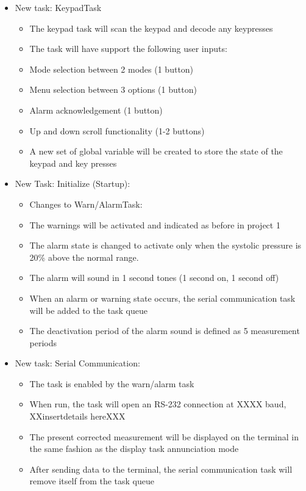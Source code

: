 \documentclass[12pt]{article} %
\begin{document}
\begin{itemize}
  \item New task: KeypadTask
    \begin{itemize}
      \item The keypad task will scan the keypad and decode any keypresses
      \item The task will have support the following user inputs:
      \item Mode selection between 2 modes (1 button)
      \item Menu selection between 3 options (1 button)
      \item Alarm acknowledgement (1 button)
      \item Up and down scroll functionality (1-2 buttons)
      \item A new set of global variable will be created to store the state of the keypad and key presses
    \end{itemize}

  \item New Task: Initialize (Startup):
    \begin{itemize}
      \item Changes to Warn/AlarmTask:
      \item The warnings will be activated and indicated as before in project 1
      \item The alarm state is changed to activate only when the systolic
	pressure is 20\% above the normal range.
      \item The alarm will sound in 1 second tones (1 second on, 1 second off)
      \item When an alarm or warning state occurs, the serial communication
	task will be added to the task queue
      \item The deactivation period of the alarm sound is defined as 5
	measurement periods
    \end{itemize}

  \item New task: Serial Communication:
    \begin{itemize}
      \item The task is enabled by the warn/alarm task
      \item When run, the task will open an RS-232 connection at XXXX baud,
	XXinsertdetails hereXXX
      \item The present corrected measurement will be displayed on the terminal
	in the same fashion as the display task annunciation mode
      \item After sending data to the terminal, the serial communication task
	will remove itself from the task queue
    \end{itemize}


\end{itemize}
\end{document}
